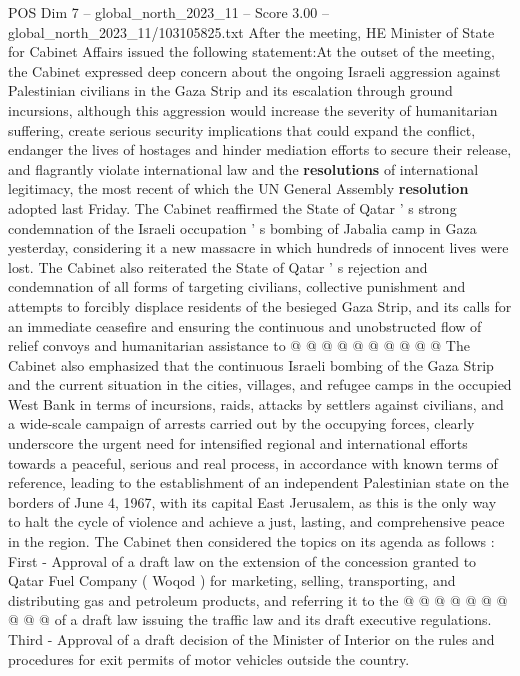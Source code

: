 \begin{textsample}{POS Dim 7 – global\_north\_2023\_11 – Score 3.00 – global\_north\_2023\_11/103105825.txt}  \label{ex:f7_pos_402}
After the meeting, HE Minister of State for Cabinet Affairs issued the following statement:At the outset of the meeting, the Cabinet expressed deep concern about the ongoing Israeli aggression against Palestinian civilians in the Gaza Strip and its escalation through ground incursions, although this aggression would increase the severity of humanitarian suffering, create serious security implications that could expand the conflict, endanger the lives of hostages and hinder mediation efforts to secure their release, and flagrantly violate international law and the \textbf{resolutions} of international legitimacy, the most recent of which the UN General Assembly \textbf{resolution} adopted last Friday.
The Cabinet reaffirmed the State of Qatar ' s strong condemnation of the Israeli occupation ' s bombing of Jabalia camp in Gaza yesterday, considering it a new massacre in which hundreds of innocent lives were lost.
The Cabinet also reiterated the State of Qatar ' s rejection and condemnation of all forms of targeting civilians, collective punishment and attempts to forcibly displace residents of the besieged Gaza Strip, and its calls for an immediate ceasefire and ensuring the continuous and unobstructed flow of relief convoys and humanitarian assistance to @ @ @ @ @ @ @ @ @ @ The Cabinet also emphasized that the continuous Israeli bombing of the Gaza Strip and the current situation in the cities, villages, and refugee camps in the occupied West Bank in terms of incursions, raids, attacks by settlers against civilians, and a wide-scale campaign of arrests carried out by the occupying forces, clearly underscore the urgent need for intensified regional and international efforts towards a peaceful, serious and real process, in accordance with known terms of reference, leading to the establishment of an independent Palestinian state on the borders of June 4, 1967, with its capital East Jerusalem, as this is the only way to halt the cycle of violence and achieve a just, lasting, and comprehensive peace in the region.
The Cabinet then considered the topics on its agenda as follows : First - Approval of a draft law on the extension of the concession granted to Qatar Fuel Company ( Woqod ) for marketing, selling, transporting, and distributing gas and petroleum products, and referring it to the @ @ @ @ @ @ @ @ @ @ of a draft law issuing the traffic law and its draft executive regulations.
Third - Approval of a draft decision of the Minister of Interior on the rules and procedures for exit permits of motor vehicles outside the country.

\end{textsample}
